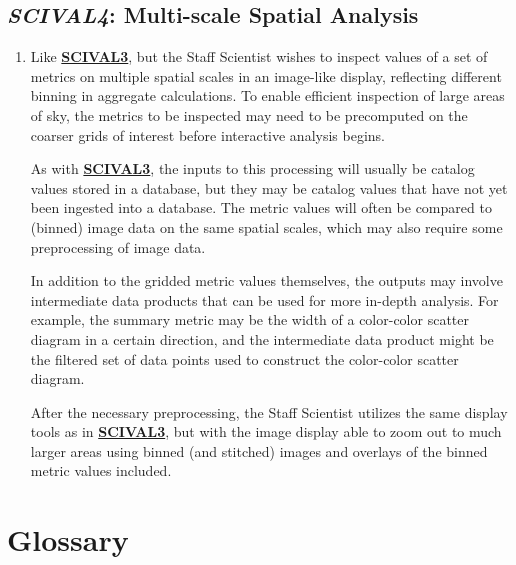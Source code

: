 \documentclass[DM,toc,lsstdraft]{lsstdoc}
\newcommand{\usecase}[3]{%
\subsection{\emph{#1}: #2}
\label{use:#1}
\begin{enumerate}[label=\alph*.]
#3
\end{enumerate}
}
\newcommand{\useref}[1]{\hyperref[use:#1]{\textcolor{lsstblue}{\textbf{#1}}}}
\begin{document}
\usecase{SCIVAL4}{Multi-scale Spatial Analysis}{%

\item
Like \useref{SCIVAL3}, but the Staff Scientist wishes to inspect values of a set of metrics on multiple spatial scales in an image-like display, reflecting different binning in aggregate calculations.
To enable efficient inspection of large areas of sky, the metrics to be inspected may need to be precomputed on the coarser grids of interest before interactive analysis begins.

As with \useref{SCIVAL3}, the inputs to this processing will usually be catalog values stored in a database, but they may be catalog values that have not yet been ingested into a database.
The metric values will often be compared to (binned) image data on the same spatial scales, which may also require some preprocessing of image data.

In addition to the gridded metric values themselves, the outputs may involve intermediate data products that can be used for more in-depth analysis.
For example, the summary metric may be the width of a color-color scatter diagram in a certain direction, and the intermediate data product might be the filtered set of data points used to construct the color-color scatter diagram.

After the necessary preprocessing, the Staff Scientist utilizes the same display tools as in \useref{SCIVAL3}, but with the image display able to zoom out to much larger areas using binned (and stitched) images and overlays of the binned metric values included.

}



\section{Glossary}
\end{document}
